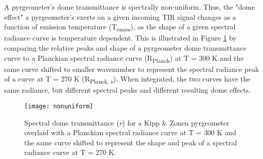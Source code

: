 A pyrgeometer's dome transmittance is spectrally non-uniform. Thus, the "dome effect" a pyrgeometer's exerts on a given incoming TIR signal changes as a function of emission temperature (T\textsubscript{emiss}), as the shape of a given spectral radiance curve is temperature dependent. This is illustrated in Figure \ref{nonuniform} by comparing the relative peaks and shape of a pyrgeometer dome transmittance curve to a Planckian spectral radiance curve (R\textsubscript{Planck}) at T = 300 \si{\kelvin} and the same curve shifted to smaller wavenumber to represent the spectral radiance peak of a curve at T = 270 \si{\kelvin} (R\textsubscript{Planck, s}). When integrated, the two curves have the same radiance, but different spectral peaks and different resulting dome effects.

\begin{figure}[H]
	\centering
	\texttt{[image: nonuniform]}
	\caption{Spectral dome transmittance (\textit{r}) for a Kipp \& Zonen pyrgeometer overlaid with a Planckian spectral radiance curve at T = 300 \si{\kelvin} and the same curve shifted to represent the shape and peak of a spectral radiance curve at T = 270 \si{\kelvin}.}
	\label{nonuniform}
\end{figure}

